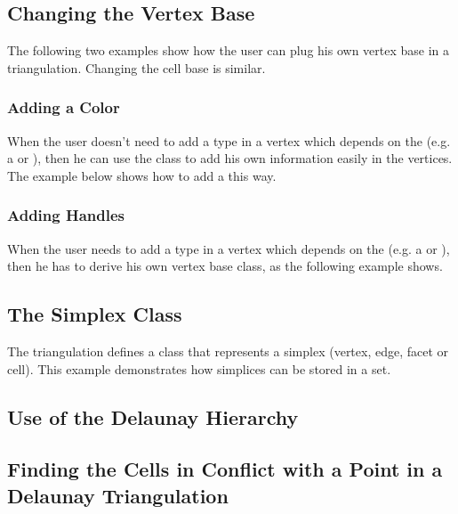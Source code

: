 {\subsection{Changing the Vertex Base}
The following two examples show how the user can plug his own vertex base in a
triangulation.  Changing the cell base is similar.

\subsubsection{Adding a Color\label{Triangulation3-sec-examples-color}}
When the user doesn't need to add a type in a vertex which depends on the
 (e.g. a  or
), then he can use the
 class to add his own information
easily in the vertices.  The example below shows how to add a 
this way.


\subsubsection{Adding Handles}
When the user needs to add a type in a vertex which depends on the
 (e.g. a  or
), then he has to derive his own vertex base class,
as the following example shows.


\subsection{The Simplex Class\label{Triangulation3-sec-simplex}}
The triangulation defines a  class that represents a
simplex (vertex, edge, facet or cell). This example demonstrates how
simplices can be stored in a set.



\subsection{Use of the Delaunay Hierarchy}


\subsection{Finding the Cells in Conflict with a Point in a Delaunay
Triangulation}

}
